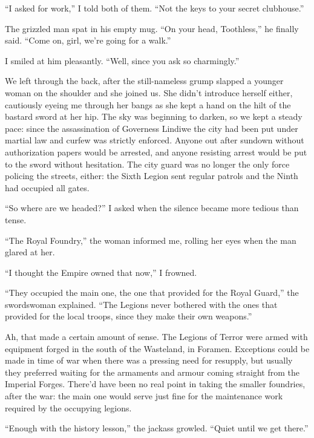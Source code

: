 \documentclass[12pt, openany]{book}
\begin{document}
“I asked for work,” I told both of them. “Not the keys to your secret clubhouse.”

The grizzled man spat in his empty mug. “On your head, Toothless,” he finally said. “Come on, girl, we’re going for a walk.”

I smiled at him pleasantly. “Well, since you ask so charmingly.”

We left through the back, after the still-nameless grump slapped a younger woman on the shoulder and she joined us. She didn’t introduce herself either, cautiously eyeing me through her bangs as she kept a hand on the hilt of the bastard sword at her hip. The sky was beginning to darken, so we kept a steady pace: since the assassination of Governess Lindiwe the city had been put under martial law and curfew was strictly enforced. Anyone out after sundown without authorization papers would be arrested, and anyone resisting arrest would be put to the sword without hesitation. The city guard was no longer the only force policing the streets, either: the Sixth Legion sent regular patrols and the Ninth had occupied all gates.

“So where are we headed?” I asked when the silence became more tedious than tense.

“The Royal Foundry,” the woman informed me, rolling her eyes when the man glared at her. 

“I thought the Empire owned that now,” I frowned.

“They occupied the main one, the one that provided for the Royal Guard,” the swordswoman explained. “The Legions never bothered with the ones that provided for the local troops, since they make their own weapons.”

Ah, that made a certain amount of sense. The Legions of Terror were armed with equipment forged in the south of the Wasteland, in Foramen. Exceptions could be made in time of war when there was a pressing need for resupply, but usually they preferred waiting for the armaments and armour coming straight from the Imperial Forges. There’d have been no real point in taking the smaller foundries, after the war: the main one would serve just fine for the maintenance work required by the occupying legions.

“Enough with the history lesson,” the jackass growled. “Quiet until we get there.”
\end{document}
